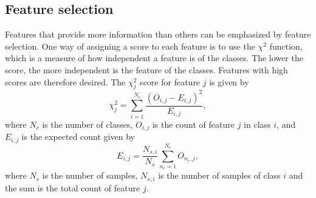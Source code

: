 \subsection{Feature selection}
Features that provide more information than others can be emphasized by feature selection. One way of assigning a score to each feature is to use the $\chi^2$ function, which is a measure of how independent a feature is of the classes. The lower the score, the more independent is the feature of the classes. Features with high scores are therefore desired. The $\chi^2_j$ score for feature $j$ is given by
\[
\chi^2_j = \sum_{i=1}^{N_c} \frac{\left ( O_{i,j} - E_{i,j} \right )^2}{E_{i,j}},
\]
where $N_c$ is the number of classes, $O_{i,j}$ is the count of feature $j$ in class $i$, and $E_{i,j}$ is the expected count given by
\[
E_{i,j} = \frac{N_{s,i}}{N_s} \sum_{n_c=1}^{N_c} O_{n_c,j} ,
\]
where $N_s$ is the number of samples, $N_{s,i}$ is the number of samples of class $i$ and the sum is the total count of feature $j$.